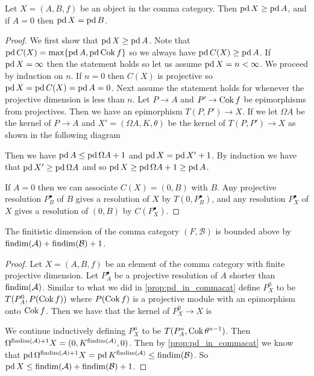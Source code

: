 \begin{prop}\cite[Lemma~4.16]{FGR75}\label{prop:pd_in_commacat}
	Let $X = (A, B, f)$ be an object in the comma category. Then $\operatorname{pd} X \geq \operatorname{pd} A$, and if $A=0$ then $\operatorname{pd} X = \operatorname{pd} B$.
	\begin{proof}
		We first show that $\operatorname{pd} X \geq \operatorname{pd} A$. Note that $\operatorname{pd} C(X) = \max\{ \operatorname{pd} A, \operatorname{pd} \operatorname{Cok} f \}$ so we always have $\operatorname{pd} C(X) \geq \operatorname{pd} A$. If $\operatorname{pd} X = \infty$ then the statement holds so let us assume $\operatorname{pd} X = n < \infty$. We proceed by induction on $n$. If $n=0$ then $C(X)$ is projective so $\operatorname{pd} X = \operatorname{pd} C(X) = \operatorname{pd} A = 0$. Next assume the statement holds for whenever the projective dimension is less than $n$. Let $P \to A$ and $P' \to \operatorname{Cok} f$ be epimorphisms from projectives. Then we have an epimorphism $T(P, P') \to X$. If we let $\Omega A$ be the kernel of $P \to A$ and $X' = (\Omega A, K, \theta)$ be the kernel of $T(P, P') \to X$ as shown in the following diagram
		\begin{center}
		\end{center}
		Then we have $\operatorname{pd} A \leq \operatorname{pd} \Omega A + 1$ and $\operatorname{pd} X = \operatorname{pd} X' + 1$. By induction we have that $\operatorname{pd} X' \geq \operatorname{pd} \Omega A$ and so $\operatorname{pd} X \geq \operatorname{pd} \Omega A +1 \geq \operatorname{pd} A$. 
		
		If $A=0$ then we can associate $C(X)=(0, B)$ with $B$. Any projective resolution $P_B^\bullet$ of $B$ gives a resolution of $X$ by $T(0, P_B^\bullet)$, and any resolution $P_X^\bullet$ of $X$ gives a resolution of $(0, B)$ by $C(P_X^\bullet)$. 
	\end{proof}
\end{prop}

\begin{theorem}\cite[Theorem~4.20]{FGR75}
	The finitistic dimension of the comma category $(F, \mathcal B)$ is bounded above by $\operatorname{findim}(\mathcal A) + \operatorname{findim}(\mathcal B) + 1$.
	\begin{proof}
		Let $X=(A, B, f)$ be an element of the comma category with finite projective dimension. Let $P_A^\bullet$ be a projective resolution of $A$ shorter than $\operatorname{findim}(\mathcal A)$. Similar to what we did in \cref{prop:pd_in_commacat} define $P_X^0$ to be $T(P_A^0, P(\operatorname{Cok} f))$ where $P(\operatorname{Cok} f)$ is a projective module with an epimorphism onto $\operatorname{Cok} f$. Then we have that the kernel of $P_X^0 \to X$ is 
		We continue inductively defining $P_X^n$ to be $T(P_A^n, \operatorname{Cok} \theta^{n-1})$. Then $\Omega^{\operatorname{findim}(\mathcal A)+1} X = (0, K^{\operatorname{findim}(\mathcal A)}, 0)$. Then by \cref{prop:pd_in_commacat} we know that $\operatorname{pd}\Omega^{\operatorname{findim}(\mathcal A)+1}X = \operatorname{pd} K^{\operatorname{findim}(\mathcal A)} \leq \operatorname{findim}(\mathcal B)$. So $\operatorname{pd} X \leq \operatorname{findim}(\mathcal A) + \operatorname{findim}(\mathcal B) + 1$.
	\end{proof}
\end{theorem}

